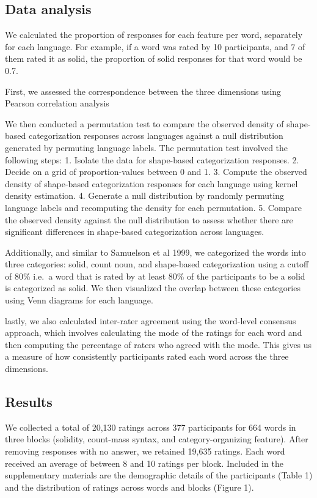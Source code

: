 \documentclass[
  english,
  man]{apa6}
\begin{document}
\subsection{Data analysis}\label{data-analysis}

We calculated the proportion of responses for each feature per word, separately for each language. For example, if a word was rated by 10 participants, and 7 of them rated it as solid, the proportion of solid responses for that word would be 0.7.

First, we assessed the correspondence between the three dimensions using Pearson correlation analysis

We then conducted a permutation test to compare the observed density of shape-based categorization responses across languages against a null distribution generated by permuting language labels. The permutation test involved the following steps:
1. Isolate the data for shape-based categorization responses.
2. Decide on a grid of proportion-values between 0 and 1.
3. Compute the observed density of shape-based categorization responses for each language using kernel density estimation.
4. Generate a null distribution by randomly permuting language labels and recomputing the density for each permutation.
5. Compare the observed density against the null distribution to assess whether there are significant differences in shape-based categorization across languages.

Additionally, and similar to Samuelson et al 1999, we categorized the words into three categories: solid, count noun, and shape-based categorization using a cutoff of 80\% i.e.~a word that is rated by at least 80\% of the participants to be a solid is categorized as solid. We then visualized the overlap between these categories using Venn diagrams for each language.

lastly, we also calculated inter-rater agreement using the word-level consensus approach, which involves calculating the mode of the ratings for each word and then computing the percentage of raters who agreed with the mode. This gives us a measure of how consistently participants rated each word across the three dimensions.

\subsection{Results}\label{results}

We collected a total of 20,130 ratings across 377 participants for 664 words in three blocks (solidity, count-mass syntax, and category-organizing feature). After removing responses with no answer, we retained 19,635 ratings. Each word received an average of between 8 and 10 ratings per block. Included in the supplementary materials are the demographic details of the participants (Table 1) and the distribution of ratings across words and blocks (Figure 1).
\end{document}
